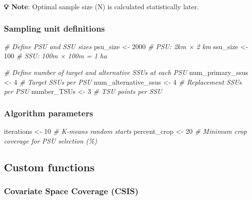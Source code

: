 \documentclass[
  10pt,
  b5paper,
  oneside]{book}
\newenvironment{Shaded}{\begin{snugshade}}{\end{snugshade}}
\newcommand{\CommentTok}[1]{\textcolor[rgb]{0.56,0.35,0.01}{\textit{#1}}}
\newcommand{\DecValTok}[1]{\textcolor[rgb]{0.00,0.00,0.81}{#1}}
\newcommand{\NormalTok}[1]{#1}
\newcommand{\OtherTok}[1]{\textcolor[rgb]{0.56,0.35,0.01}{#1}}
\begin{document}
\textbf{💡 Note}: Optimal sample size (N) is calculated statistically later.

\subsubsection{Sampling unit definitions}\label{sampling-unit-definitions}

\begin{Shaded}
\begin{Highlighting}[]
\CommentTok{\# Define PSU and SSU sizes }
\NormalTok{psu\_size }\OtherTok{\textless{}{-}} \DecValTok{2000}   \CommentTok{\# PSU: 2km × 2 km}
\NormalTok{ssu\_size }\OtherTok{\textless{}{-}} \DecValTok{100}    \CommentTok{\# SSU: 100m × 100m = 1 ha}

\CommentTok{\# Define number of target and alternative SSUs at each PSU}
\NormalTok{num\_primary\_ssus     }\OtherTok{\textless{}{-}} \DecValTok{4}   \CommentTok{\# Target SSUs per PSU}
\NormalTok{num\_alternative\_ssus }\OtherTok{\textless{}{-}} \DecValTok{4}   \CommentTok{\# Replacement SSUs per PSU}
\NormalTok{number\_TSUs          }\OtherTok{\textless{}{-}} \DecValTok{3}   \CommentTok{\# TSU points per SSU}
\end{Highlighting}
\end{Shaded}

\subsubsection{Algorithm parameters}\label{algorithm-parameters}

\begin{Shaded}
\begin{Highlighting}[]
\NormalTok{iterations   }\OtherTok{\textless{}{-}} \DecValTok{10}   \CommentTok{\# K{-}means random starts}
\NormalTok{percent\_crop }\OtherTok{\textless{}{-}} \DecValTok{20}   \CommentTok{\# Minimum crop coverage for PSU selection (\%)}
\end{Highlighting}
\end{Shaded}

\subsection{Custom functions}\label{custom-functions}

\subsubsection{Covariate Space Coverage (CSIS)}\label{covariate-space-coverage-csis}
\end{document}

